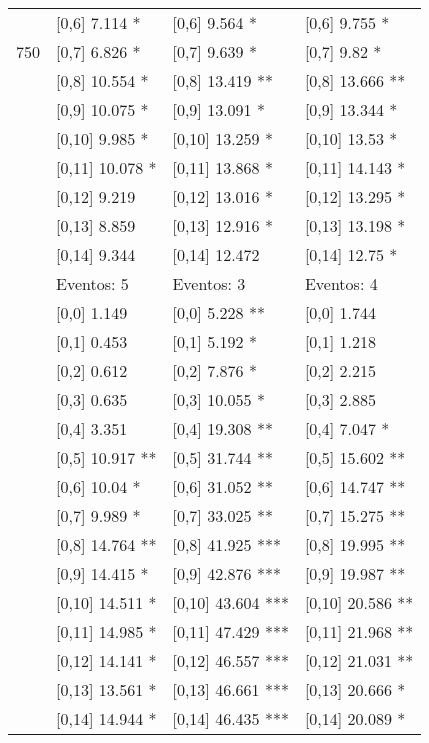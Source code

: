\begin{table}
\begin{tabular}[t]{llll}
 & {}[0,6] 7.114 * & {}[0,6] 9.564 * & {}[0,6] 9.755 *\\
750 & {}[0,7] 6.826 * & {}[0,7] 9.639 * & {}[0,7] 9.82 *\\
\addlinespace
 & {}[0,8] 10.554 * & {}[0,8] 13.419 ** & {}[0,8] 13.666 **\\
 & {}[0,9] 10.075 * & {}[0,9] 13.091 * & {}[0,9] 13.344 *\\
 & {}[0,10] 9.985 * & {}[0,10] 13.259 * & {}[0,10] 13.53 *\\
 & {}[0,11] 10.078 * & {}[0,11] 13.868 * & {}[0,11] 14.143 *\\
 & {}[0,12] 9.219 & {}[0,12] 13.016 * & {}[0,12] 13.295 *\\
\addlinespace
 & {}[0,13] 8.859 & {}[0,13] 12.916 * & {}[0,13] 13.198 *\\
 & {}[0,14] 9.344 & {}[0,14] 12.472 & {}[0,14] 12.75 *\\
 & Eventos:  5 & Eventos:  3 & Eventos:  4\\
 & {}[0,0] 1.149 & {}[0,0] 5.228 ** & {}[0,0] 1.744\\
 & {}[0,1] 0.453 & {}[0,1] 5.192 * & {}[0,1] 1.218\\
\addlinespace
 & {}[0,2] 0.612 & {}[0,2] 7.876 * & {}[0,2] 2.215\\
 & {}[0,3] 0.635 & {}[0,3] 10.055 * & {}[0,3] 2.885\\
 & {}[0,4] 3.351 & {}[0,4] 19.308 ** & {}[0,4] 7.047 *\\
 & {}[0,5] 10.917 ** & {}[0,5] 31.744 ** & {}[0,5] 15.602 **\\
 & {}[0,6] 10.04 * & {}[0,6] 31.052 ** & {}[0,6] 14.747 **\\
\addlinespace
1000 & {}[0,7] 9.989 * & {}[0,7] 33.025 ** & {}[0,7] 15.275 **\\
 & {}[0,8] 14.764 ** & {}[0,8] 41.925 *** & {}[0,8] 19.995 **\\
 & {}[0,9] 14.415 * & {}[0,9] 42.876 *** & {}[0,9] 19.987 **\\
 & {}[0,10] 14.511 * & {}[0,10] 43.604 *** & {}[0,10] 20.586 **\\
 & {}[0,11] 14.985 * & {}[0,11] 47.429 *** & {}[0,11] 21.968 **\\
\addlinespace
 & {}[0,12] 14.141 * & {}[0,12] 46.557 *** & {}[0,12] 21.031 **\\
 & {}[0,13] 13.561 * & {}[0,13] 46.661 *** & {}[0,13] 20.666 *\\
 & {}[0,14] 14.944 * & {}[0,14] 46.435 *** & {}[0,14] 20.089 *\\
\bottomrule
\end{tabular}
\end{table}
